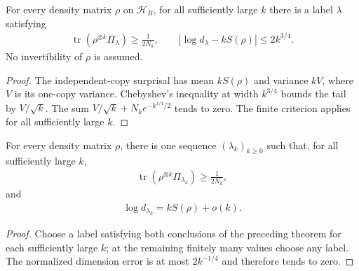 \begin{theorem}
\label{thm:high_label_iid_window}
\leanok
{}
For every density matrix $\rho$ on $\mathcal H_R$, for all sufficiently
large $k$ there is a label $\lambda$ satisfying
\begin{align}
 \operatorname{tr}(\rho^{\otimes k}\Pi_\lambda)\ge\frac1{2N_k},
 \qquad |\log d_\lambda-kS(\rho)|\le2k^{3/4}.
\end{align}
No invertibility of $\rho$ is assumed.
\end{theorem}
\begin{proof}
\leanok
{}
The independent-copy surprisal has mean $kS(\rho)$ and variance $kV$,
where $V$ is its one-copy variance. Chebyshev's inequality at width
$k^{3/4}$ bounds the tail by $V/\sqrt{k}$.
The sum $V/\sqrt{k}+N_k e^{-k^{3/4}/2}$ tends to zero.
The finite criterion applies for all sufficiently large $k$.
\end{proof}

\begin{theorem}
\label{thm:high_label_common_sequence}
\leanok
{}
For every density matrix $\rho$, there is one sequence $(\lambda_k)_{k\ge0}$
such that, for all sufficiently large $k$,
\begin{align}
 \operatorname{tr}(\rho^{\otimes k}\Pi_{\lambda_k})\ge\frac1{2N_k},
\end{align}
and
\begin{align}
 \log d_{\lambda_k}=kS(\rho)+o(k).
\end{align}
\end{theorem}
\begin{proof}
\leanok
{}
Choose a label satisfying both conclusions of the preceding theorem for
each sufficiently large $k$; at the remaining finitely many values choose
any label. The normalized dimension error is at most $2k^{-1/4}$ and
therefore tends to zero.
\end{proof}

